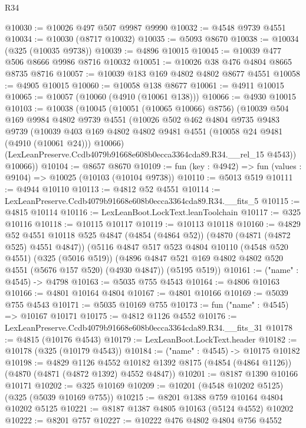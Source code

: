 \begin{lexlean}{R34}
\begin{coremodule}
@10030 := @10026 @497 @507 @9987 @9990
@10032 := @4548 @9739 @4551
@10034 := @10030 (@8717 @10032)
@10035 := @5093 @8670
@10038 := @10034 (@325 (@10035 @9738))
@10039 := @4896 @10015
@10045 := @10039 @477 @506 @8666 @9986 @8716 @10032
@10051 := @10026 @38 @476 @4804 @8665 @8735 @8716
@10057 := @10039 @183 @169 @4802 @4802 @8677 @4551
@10058 := @4905 @10015
@10060 := @10058 @138 @8677
@10061 := @4911 @10015
@10065 := @10057 (@10060 (@4910 (@10061 @138)))
@10066 := @4930 @10015
@10103 := @10038
    (@10045
      (@10051 (@10065 @10066) @8756)
      (@10039
        @504
        @169
        @9984
        @4802
        @9739
        @4551
        (@10026
          @502
          @462
          @4804
          @9735
          @9483
          @9739
          (@10039 @403 @169 @4802 @4802 @9481 @4551 (@10058 @24 @9481 (@4910 (@10061 @24))) @10066)
          (LexLeanPreserve.Ccdb4079b91668e608b0ecca3364cda89.R34.__rel_15 @4543))
        @10066))
@10104 := @8657 @8670
@10109 := fun (key : @4942) => fun (values : @9104) => @10025 (@10103 (@10104 @9738))
@10110 := @5013 @519
@10111 := @4944 @10110
@10113 := @4812 @52 @4551
@10114 := LexLeanPreserve.Ccdb4079b91668e608b0ecca3364cda89.R34.__fits_5
@10115 := @4815 @10114
@10116 := LexLeanBoot.LockText.leanToolchain
@10117 := @325 @10116
@10118 := @10115 @10117
@10119 := @10113 @10118
@10160 := @4829
    @52
    @4551
    @10118
    @525
    @4847
    (@4854 (@4864 @52))
    (@4870 (@4871 (@4872 @525) @4551 @4847))
    (@5116
      @4847
      @517
      @523
      @4804
      @10110
      (@4548 @520 @4551)
      (@325 (@5016 @519))
      (@4896 @4847 @521 @169 @4802 @4802 @520 @4551 (@5676 @157 @520) (@4930 @4847))
      (@5195 @519))
@10161 := ("name" : @4545) -> @4798
@10163 := @5035 @755 @4543
@10164 := @4806 @10163
@10166 := @4801 @10164 @4804
@10167 := @4801 @10166
@10169 := @5039 @755 @4543
@10171 := @5035 @10169 @755
@10173 := fun ("name" : @4545) => @10167 @10171
@10175 := @4812 @1126 @4552
@10176 := LexLeanPreserve.Ccdb4079b91668e608b0ecca3364cda89.R34.__fits_31
@10178 := @4815 (@10176 @4543)
@10179 := LexLeanBoot.LockText.header
@10182 := @10178 (@325 (@10179 @4543))
@10184 := ("name" : @4545) -> @10175 @10182
@10198 := @4829
    @1126
    @4552
    @10182
    @1392
    @8175
    (@4854 (@4864 @1126))
    (@4870 (@4871 (@4872 @1392) @4552 @4847))
@10201 := @8187 @1390 @10166 @10171
@10202 := @325 @10169
@10209 := @10201 (@4548 @10202 @5125) (@325 (@5039 @10169 @755))
@10215 := @8201 @1388 @759 @10164 @4804 @10202 @5125
@10221 := @8187 @1387 @4805 @10163 (@5124 @4552) @10202
@10222 := @8201 @757
@10227 := @10222 @476 @4802 @4804 @756 @4552

\end{coremodule}
\end{lexlean}
